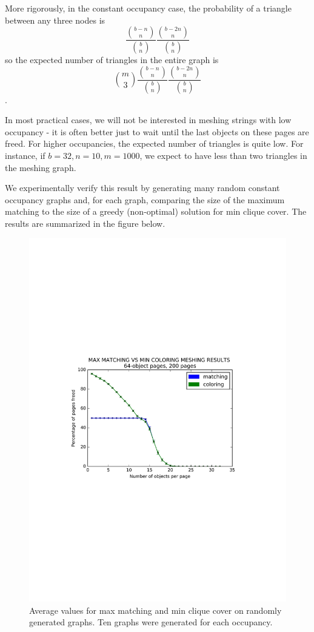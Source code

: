 More rigorously, in the constant occupancy case, the probability of a triangle between any three nodes is $$\frac{{{b-n}\choose{n}}}{{{b}\choose{n}}}\frac{{{b-2n}\choose{n}}}{{{b}\choose{n}}}$$ so the expected number of triangles in the entire graph is $${{m}\choose{3}}\frac{{{b-n}\choose{n}}}{{{b}\choose{n}}}\frac{{{b-2n}\choose{n}}}{{{b}\choose{n}}}$$.

In most practical cases, we will not be interested in meshing strings with low occupancy - it is often better just to wait until the last objects on these pages are freed.  For higher occupancies, the expected number of triangles is quite low.  For instance, if $b = 32, n = 10, m = 1000$, we expect to have less than two triangles in the meshing graph.

We experimentally verify this result by generating many random constant occupancy graphs and, for each graph, comparing the size of the maximum matching to the size of a greedy (non-optimal) solution for min clique cover.  The results are summarized in the figure below.

\begin{figure}[h]
\includegraphics[scale = .5]{figures/comparison.pdf}
\centering
\caption{Average values for max matching and min clique cover on randomly generated graphs.  Ten graphs were generated for each occupancy.}
\end{figure}

